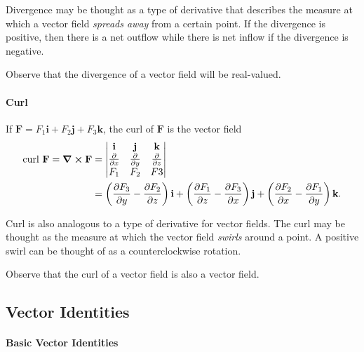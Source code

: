 Divergence may be thought as a type of derivative that describes the measure at which a vector field \textit{spreads away} from a certain point. If the divergence is positive, then there is a net outflow while there is net inflow if the divergence is negative. 

Observe that the divergence of a vector field will be real-valued.

\paragraph{Curl}
If \(\textbf{F} = F_1\textbf{i} + F_2\textbf{j} + F_3\textbf{k}\), the curl of \(\textbf{F}\) is the vector field
\begin{align*}
    \text{curl } \textbf{F} = \curl \textbf{F} & = 
    \begin{vmatrix}
        \textbf{i} & \textbf{j} & \textbf{k}\\
        \frac{\partial}{\partial x} & \frac{\partial}{\partial y} & \frac{\partial}{\partial z} \\
        F_1 & F_2 & F3
    \end{vmatrix} \\
    & = \left( \frac{\partial F_3}{\partial y} - \frac{\partial F_2}{\partial z}\right)\textbf{i} + \left( \frac{\partial F_1}{\partial z} - \frac{\partial F_3}{\partial x}\right)\textbf{j} + \left( \frac{\partial F_2}{\partial x} - \frac{\partial F_1}{\partial y}\right)\textbf{k}.
\end{align*}

Curl is also analogous to a type of derivative for vector fields. The curl may be thought as the measure at which the vector field \textit{swirls} around a point. A positive swirl can be thought of as a counterclockwise rotation.

Observe that the curl of a vector field is also a vector field.

\subsection{Vector Identities}


\paragraph{Basic Vector Identities}

